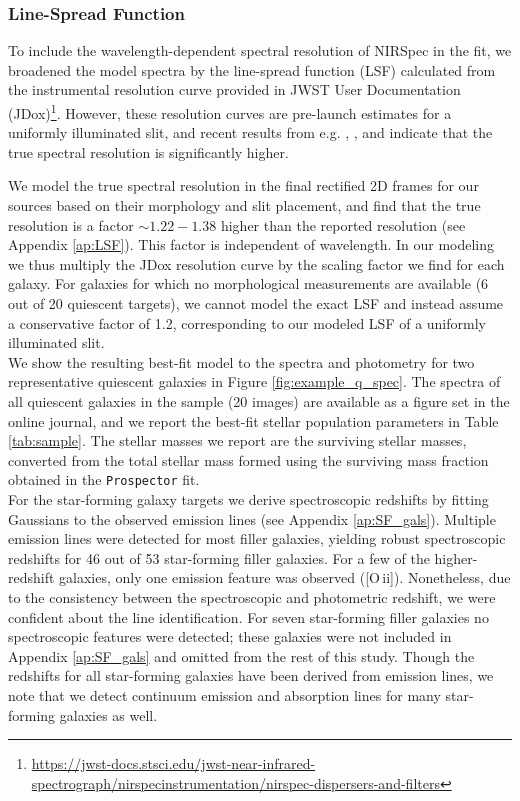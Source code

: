 \documentclass[twocolumn, astrosymb]{aastex631}
\begin{document}
\subsubsection{Line-Spread Function}
To include the wavelength-dependent spectral resolution of NIRSpec in the fit, we broadened the model spectra by the line-spread function (LSF) calculated from the instrumental resolution curve provided in JWST User Documentation (JDox)\footnote{\url{https://jwst-docs.stsci.edu/jwst-near-infrared-spectrograph/nirspecinstrumentation/nirspec-dispersers-and-filters}}. However, these resolution curves are pre-launch estimates for a uniformly illuminated slit, and recent results from e.g. \citet{AdeGraaff2023}, \citet{DNidever2024}, and \citet{TNanayakkara2024} indicate that the true spectral resolution is significantly higher. 

We model the true spectral resolution in the final rectified 2D frames for our sources based on their morphology and slit placement, and find that the true resolution is a factor $\sim1.22-1.38$ higher than the reported resolution (see Appendix \ref{ap:LSF}). This factor is independent of wavelength. In our modeling we thus multiply the JDox resolution curve by the scaling factor we find for each galaxy. For galaxies for which no morphological measurements are available (6 out of 20 quiescent targets), we cannot model the exact LSF and instead assume a conservative factor of 1.2, corresponding to our modeled LSF of a uniformly illuminated slit.\\

We show the resulting best-fit model to the spectra and photometry for two representative quiescent galaxies in Figure \ref{fig:example_q_spec}. The spectra of all quiescent galaxies in the sample (20 images) are available as a figure set in the online journal, and we report the best-fit stellar population parameters in Table \ref{tab:sample}. The stellar masses we report are the surviving stellar masses, converted from the total stellar mass formed using the surviving mass fraction obtained in the \texttt{Prospector} fit.\\

For the star-forming galaxy targets we derive spectroscopic redshifts by fitting Gaussians to the observed emission lines (see Appendix \ref{ap:SF_gals}). Multiple emission lines were detected for most filler galaxies, yielding robust spectroscopic redshifts for 46 out of 53 star-forming filler galaxies. For a few of the higher-redshift galaxies, only one emission feature was observed ([O\,{\sc ii}]). Nonetheless, due to the consistency between the spectroscopic and photometric redshift, we were confident about the line identification. For seven star-forming filler galaxies no spectroscopic features were detected; these galaxies were not included in Appendix \ref{ap:SF_gals} and omitted from the rest of this study. Though the redshifts for all star-forming galaxies have been derived from emission lines, we note that we detect continuum emission and absorption lines for many star-forming galaxies as well.
\end{document}
